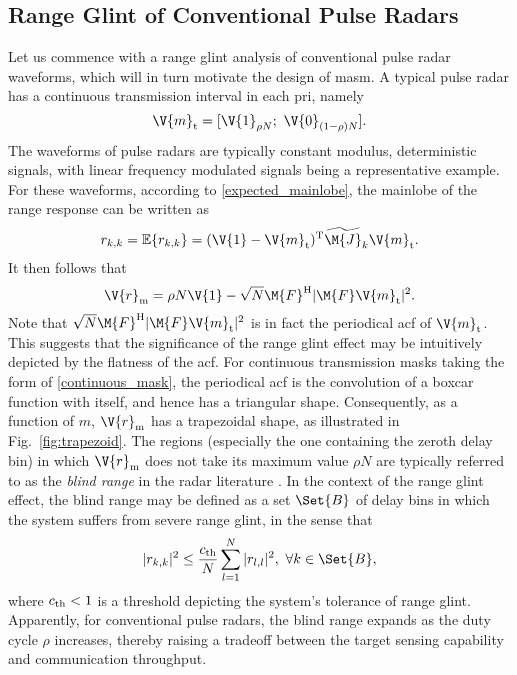 \documentclass[journal,a4paper,10pt, romanappendices]{IEEEtran}
\begin{document}
\subsection{Range Glint of Conventional Pulse Radars}\label{ssec:conventional}
Let us commence with a range glint analysis of conventional pulse radar waveforms, which will in turn motivate the design of \ac{masm}. A typical pulse radar has a continuous transmission interval in each \ac{pri}, namely
\begin{equation}\label{continuous_mask}
\V{m}_{\rm t} = [\V{1}_{\rho N};~\V{0}_{(1-\rho)N}].
\end{equation}
The waveforms of pulse radars are typically constant modulus, deterministic signals, with linear frequency modulated signals being a representative example. For these waveforms, according to \eqref{expected_mainlobe}, the mainlobe of the range response can be written as
\begin{align}
r_{k,k} = \mathbb{E}\{r_{k,k}\} = (\V{1}-\V{m}_{\rm t})^{\rm T}\widetilde{\M{J}}_k \V{m}_{\rm t}.
\end{align}
It then follows that
\begin{equation}
\V{r}_{\rm m} =\rho N\V{1} - \sqrt{N}\M{F}^{\rm H}|\M{F}\V{m}_{\rm t}|^2.
\end{equation}
Note that $\sqrt{N}\M{F}^{\rm H}|\M{F}\V{m}_{\rm t}|^2$ is in fact the periodical \ac{acf} of $\V{m}_{\rm t}$. This suggests that the significance of the range glint effect may be intuitively depicted by the flatness of the \ac{acf}. For continuous transmission masks taking the form of \eqref{continuous_mask}, the periodical \ac{acf} is the convolution of a boxcar function with itself, and hence has a triangular shape. Consequently, as a function of $m$, $\V{r}_{\rm m}$ has a trapezoidal shape, as illustrated in Fig.~\ref{fig:trapezoid}. The regions (especially the one containing the zeroth delay bin) in which $\V{r}_{\rm m}$ does not take its maximum value $\rho N$ are typically referred to as the \emph{blind range} in the radar literature \cite[Sec.~1.5]{radar_analysis}. In the context of the range glint effect, the blind range may be defined as a set $\Set{B}$ of delay bins in which the system suffers from severe range glint, in the sense that
$$
|r_{k,k}|^2\leq \frac{c_{\rm th}}{N}\sum_{l=1}^N |r_{l,l}|^2,~\forall k\in\Set{B},
$$
where $c_{\rm th}<1$ is a threshold depicting the system's tolerance of range glint.  Apparently, for conventional pulse radars, the blind range expands as the duty cycle $\rho$ increases, thereby raising a tradeoff between the target sensing capability and communication throughput.
\end{document}
